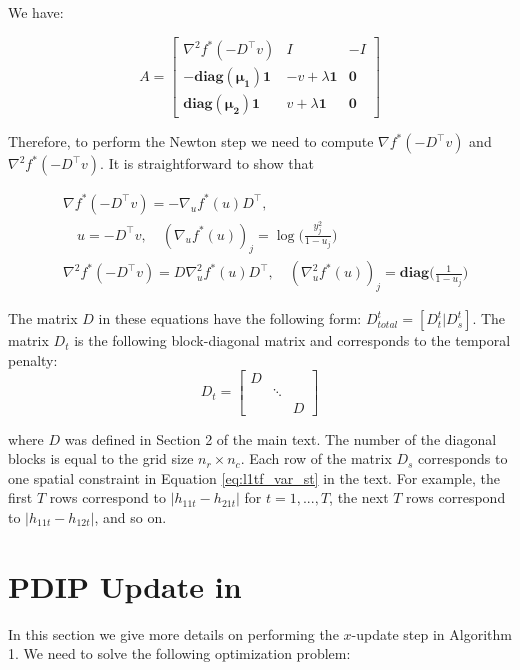 \documentclass[letterpaper]{article} %
\newcommand{\autoref}{\Cref}
\newcommand{\one}{\mathbf{1}}
\begin{document}
We have:

\begin{equation}
A=
\begin{bmatrix}
	\nabla^2 f^*(-D^\top v) & I & -I\\
	-\mathbf{diag(\mu_1)}\one & -v+\lambda\one & \mathbf{0}\\
	\mathbf{diag(\mu_2)}\one & v+\lambda\one & \mathbf{0}
	\end{bmatrix}
\label{eq:delta_r}
\end{equation}

Therefore, to perform the Newton step we need to compute $\nabla f^*(-D^\top v)$ and $\nabla^2 f^*(-D^\top v)$. It is straightforward to show that

\begin{align}
& \nabla f^*(-D^\top v) =  -\nabla_u f^*(u) D^\top ,\\
& \quad u=-D^\top v, \quad (\nabla_u f^*(u))_j=\log\bigg(\frac{y_j^2}{1-u_j}\bigg) \\
& \nabla^2 f^*(-D^\top v)=D\nabla_u^2 f^*(u)D^\top, \quad (\nabla_u^2 f^*(u))_j=\mathbf{diag}\bigg(\frac{1}{1-u_j}\bigg)
\end{align}

The matrix $D$ in these equations have the following form:  $D_{total}^t=[D_{t}^t|D_{s}^t]$. The matrix $D_t$ is the following block-diagonal matrix and corresponds to the temporal penalty: 
 \begin{equation}
 D_t=\begin{bmatrix}
 D &  & \\ 
  & \ddots & \\
  &  & D
 \end{bmatrix}
 \label{eq:d_t_matrix}
 \end{equation}

where $D$ was defined in Section 2 of the main text. The number of the diagonal blocks is equal to the grid size $n_r \times n_c$. Each row of the matrix $D_s$ corresponds to one spatial constraint in Equation \eqref{eq:l1tf_var_st} in the text. For example, the first $T$ rows correspond to $|h_{11t}-h_{21t}|$ for $t=1,...,T$, the next $T$ rows correspond to $|h_{11t}-h_{12t}|$, and so on. 


\section{PDIP Update in~\autoref{alg:conADMM}}
\label{sec:app_consADMM}

In this section we give more details on performing the $x$-update step in Algorithm 1. We need to solve the following optimization problem:
\end{document}
